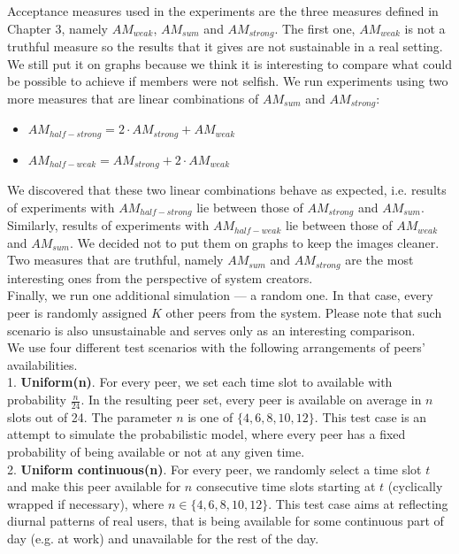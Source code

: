 \documentclass{pracamgren}
\begin{document}
Acceptance measures used in the experiments are the three measures defined in Chapter 3, namely $AM_{weak}$, $AM_{sum}$ and $AM_{strong}$. The first one, $AM_{weak}$ is not a truthful measure so the results that it gives are not sustainable in a real setting. We still put it on graphs because we think it is interesting to compare what could be possible to achieve if members were not selfish. We run experiments using two more measures that are linear combinations of $AM_{sum}$ and $AM_{strong}$:
\begin{itemize}
\item $AM_{half-strong} = 2 \cdot AM_{strong} + AM_{weak}$
\item $AM_{half-weak} = AM_{strong} + 2 \cdot AM_{weak}$
\end{itemize}
We discovered that these two linear combinations behave as expected, i.e. results of experiments with $AM_{half-strong}$ lie between those of $AM_{strong}$ and $AM_{sum}$. Similarly, results of experiments with $AM_{half-weak}$ lie between those of $AM_{weak}$ and $AM_{sum}$. We decided not to put them on graphs to keep the images cleaner. Two measures that are truthful, namely $AM_{sum}$ and $AM_{strong}$ are the most interesting ones from the perspective of system creators.\\

Finally, we run one additional simulation --- a random one. In that case, every peer is randomly assigned $K$ other peers from the system. Please note that such scenario is also unsustainable and serves only as an interesting comparison.\\

We use four different test scenarios with the following arrangements of peers' availabilities.\\

1. {\bf Uniform(n)}. For every peer, we set each time slot to available with probability $\frac{n}{24}$. In the resulting peer set, every peer is available on average in $n$ slots out of 24. The parameter $n$ is one of $\{4,6,8,10,12\}$. This test case is an attempt to simulate the probabilistic model, where every peer has a fixed probability of being available or not at any given time.\\

2. {\bf Uniform continuous(n)}. For every peer, we randomly select a time slot $t$ and make this peer available for $n$ consecutive time slots starting at $t$ (cyclically wrapped if necessary), where $n\in\{4,6,8,10,12\}$. This test case aims at reflecting diurnal patterns of real users, that is being available for some continuous part of day (e.g. at work) and unavailable for the rest of the day.\\
\end{document}
